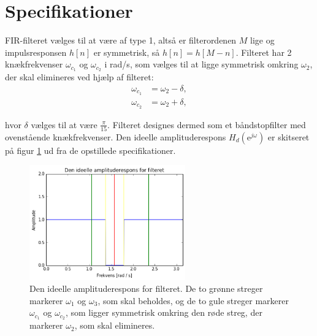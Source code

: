 \section{Specifikationer} \label{ch4_specs}
FIR-filteret vælges til at være af type 1, altså er filterordenen $M$ lige og impulsresponsen $h[n]$ er symmetrisk, så $h[n] = h[M - n]$. Filteret har 2 knækfrekvenser $\omega_{c_1}$ og $\omega_{c_2}$ i rad/s, som vælges til at ligge symmetrisk omkring $\omega_2$, der skal elimineres ved hjælp af filteret:
\begin{align*}
\omega_{c_1} &= \omega_2 - \delta, \\
\omega_{c_2} &= \omega_2 + \delta,
\end{align*}

hvor $\delta$ vælges til at være $\frac{\pi}{15}$. Filteret designes dermed som et båndstopfilter med ovenstående knækfrekvenser. Den ideelle amplituderespons $H_d(\text{e}^{j\omega})$ er skitseret på figur \ref{fig:ideel_amp_respons} ud fra de opstillede specifikationer.   
\begin{figure}[H]
    \centering
    \includegraphics[width = 0.6\textwidth]{figures/ideel_amp_respons.PNG}
    \caption{Den ideelle amplituderespons for filteret. De to grønne streger markerer $\omega_1$ og $\omega_3$, som skal beholdes, og de to gule streger markerer $\omega_{c_1}$ og $\omega_{c_2}$, som ligger symmetrisk omkring den røde streg, der markerer $\omega_2$, som skal elimineres.}
    \label{fig:ideel_amp_respons}
\end{figure}
